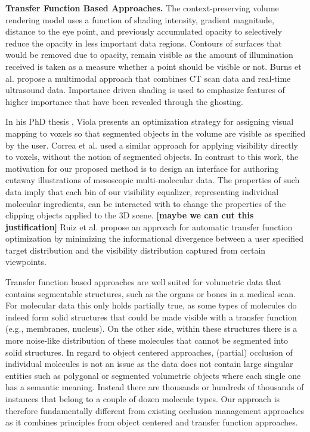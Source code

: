 \noindent
\textbf{Transfer Function Based Approaches.}
The context-preserving volume rendering model \cite{Bruckner05} uses a function of shading intensity, gradient magnitude, distance to the eye point, and previously accumulated opacity to selectively reduce the opacity in less important data regions. Contours of surfaces that would be removed due to opacity, remain visible as the amount of illumination received is taken as a measure whether a point should be visible or not.
Burns et al. \cite{Burns07} propose a multimodal approach that combines CT scan data and real-time ultrasound data. Importance driven shading is used to emphasize features of higher importance that have been revealed through the ghosting.

In his PhD thesis \cite{phd-viola}, Viola presents an optimization strategy for assigning visual mapping to voxels so that segmented objects in the volume are visible as specified by the user. Correa et al. \cite{correa11} used a similar approach for applying visibility directly to voxels, without the notion of segmented objects.
In contrast to this work, the motivation for our proposed method is to design an interface for authoring cutaway illustrations of mesoscopic multi-molecular data. The properties of such data imply that each bin of our visibility equalizer, representing individual molecular ingredients, can be interacted with to change the properties of the clipping objects applied to the 3D scene. \textbf{[maybe we can cut this justification]}
Ruiz et al. \cite{ruiz11} propose an approach for automatic transfer function optimization by minimizing the informational divergence between a user specified target distribution and the visibility distribution captured from certain viewpoints. 

Transfer function based approaches are well suited for volumetric data that contains segmentable structures, such as the organs or bones in a medical scan. For molecular data this only holds partially true, as some types of molecules do indeed form solid structures that could be made visible with a transfer function (e.g., membranes, nucleus). On the other side, within these structures there is a more noise-like distribution of these molecules that cannot be segmented into solid structures. 
In regard to object centered approaches, (partial) occlusion of individual molecules is not an issue as the data does not contain large singular entities such as polygonal or segmented volumetric objects where each single one has a semantic meaning. Instead there are thousands or hundreds of thousands of instances that belong to a couple of dozen molecule types.
Our approach is therefore fundamentally different from existing occlusion management approaches as it combines principles from object centered and transfer function approaches. 


